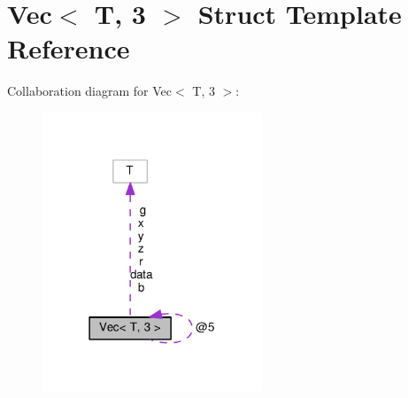 \hypertarget{structVec_3_01T_00_013_01_4}{}\section{Vec$<$ T, 3 $>$ Struct Template Reference}
\label{structVec_3_01T_00_013_01_4}


Collaboration diagram for Vec$<$ T, 3 $>$\+:\nopagebreak
\begin{figure}[H]
\begin{center}
\leavevmode
\includegraphics[width=186pt]{structVec_3_01T_00_013_01_4__coll__graph}
\end{center}
\end{figure}
